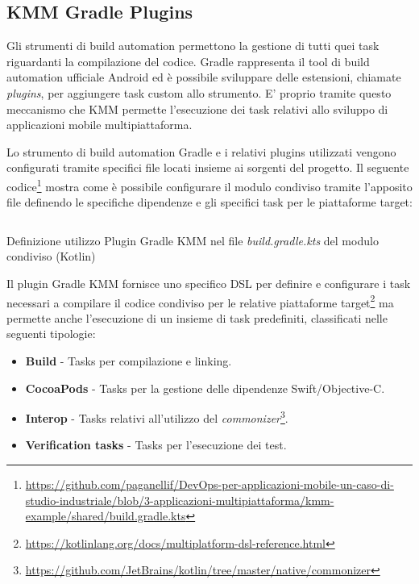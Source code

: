 \subsection{KMM Gradle Plugins}
Gli strumenti di build automation permettono la gestione di tutti quei task riguardanti la compilazione del codice. 
Gradle rappresenta il tool di build automation ufficiale Android ed è possibile sviluppare delle estensioni, 
chiamate \textit{plugins}, 
per aggiungere task custom allo strumento. 
E' proprio tramite questo meccanismo che KMM permette l'esecuzione dei task relativi allo sviluppo di applicazioni mobile multipiattaforma.

Lo strumento di build automation Gradle e i relativi plugins utilizzati vengono configurati tramite specifici file locati insieme ai sorgenti del progetto. 
Il seguente codice\footnote{\href{https://github.com/paganellif/DevOps-per-applicazioni-mobile-un-caso-di-studio-industriale/blob/3-applicazioni-multipiattaforma/kmm-example/shared/build.gradle.kts}{https://github.com/paganellif/DevOps-per-applicazioni-mobile-un-caso-di-studio-industriale/blob/3-applicazioni-multipiattaforma/kmm-example/shared/build.gradle.kts}} mostra come è possibile configurare il modulo condiviso tramite l'apposito file definendo le specifiche dipendenze e gli specifici task per le piattaforme target:

\begin{listing}[H]
\inputminted{kotlin}{code/build.gradle.kts}
\caption{Definizione utilizzo Plugin Gradle KMM nel file \textit{build.gradle.kts} del modulo condiviso (Kotlin)}
\end{listing}

Il plugin Gradle KMM fornisce uno specifico DSL per definire e configurare i task necessari a compilare il codice condiviso per le relative piattaforme target\footnote{\href{https://kotlinlang.org/docs/multiplatform-dsl-reference.html}{https://kotlinlang.org/docs/multiplatform-dsl-reference.html}} ma permette anche l'esecuzione di un insieme di task predefiniti,
classificati nelle seguenti tipologie:

\begin{itemize}
    \item \textbf{Build} - Tasks per compilazione e linking.
    
    \item \textbf{CocoaPods} - Tasks per la gestione delle dipendenze Swift/Objective-C.
    
    \item \textbf{Interop} - Tasks relativi all'utilizzo del \textit{commonizer}\footnote{\href{https://github.com/JetBrains/kotlin/tree/master/native/commonizer}{https://github.com/JetBrains/kotlin/tree/master/native/commonizer}}.
    
    \item \textbf{Verification tasks} - Tasks per l'esecuzione dei test.
\end{itemize}

